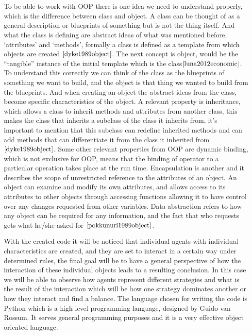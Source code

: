 \documentclass{book}
\begin{document}
\\\\To be able to work with OOP there is one idea we need to understand properly, which is the difference between class and object. A class can be thought of as a general description or blueprints of something but is not the thing itself.  And what the class is defining are abstract ideas of what was mentioned before, `attributes’ and `methods’, formally a class is defined as a template from which objects are created $\cite{dyke1989object}$. The next concept is object,  would be the ``tangible'' instance of the initial template which is the class$\cite{luna2012economic}$. To understand this correctly we can think of the class as the blueprints of something we want to build, and the object is that thing we wanted to build from the blueprints. And when creating an object the abstract ideas from the class, become specific characteristics of the object. A relevant property is inheritance, which allows a class to inherit methods and attributes from another class, this makes the class that inherits a subclass of the class it inherits from, it’s important to mention that this subclass can redefine inherited methods and can add methods that can differentiate it from the class it inherited from $\cite{dyke1989object}$.  Some other relevant properties from OOP are dynamic binding, which is not exclusive for OOP, means that the binding of operator to a particular operation takes place at the run time. Encapsulation is another and it describes the scope of unrestricted reference to the attributes of an object. An object can examine and modify its own attributes, and allows access to its attributes to other objects through accessing functions allowing it to have control over any changes requested from other variables. Data abstraction refers to how any object can be required for any information, and the fact that who requests gets what he/she asked for $\cite{pokkunuri1989object}$. 

With the created code it will be noticed that individual agents with individual characteristics are created, and they are set to interact in a certain way under determined rules, the final goal will be to have a general perspective of how the interaction of these individual objects leads to a resulting conclusion. In this case we will be able to observe how agents represent different strategies and what is the result of the interaction which will be how one strategy dominates another or how they interact and find a balance. The language chosen for writing the code is Python which is a high level programming language, designed by Guido van Rossum. It serves general programming purposes and it is a very effective object oriented language.
\end{document}
